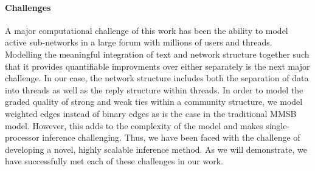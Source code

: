 \documentclass{sig-alternate}
\begin{document}
\paragraph{Challenges} A major computational challenge of this work has been the ability to model
active sub-networks in a large forum with millions of users and
threads.  Modelling the meaningful integration of text and network structure together such that it provides
quantifiable improvments over either separately is the next major challenge.  In our case, the network structure includes both the separation of data into threads as well as the reply structure within threads.
In order to model the graded quality of strong and weak ties within a community structure, we model weighted edges instead of binary edges as is the case in the traditional MMSB model. However, this adds to the 
complexity of the model and makes single-processor inference challenging. Thus, we have been faced with the challenge of developing a novel, highly scalable inference method.  As we will demonstrate, we have successfully met each of these challenges in our work.

\vspace*{-0.5\baselineskip}
\end{document}
